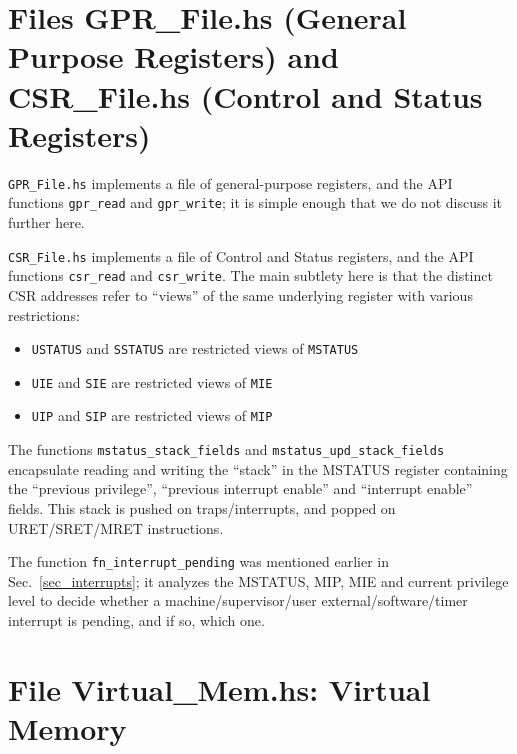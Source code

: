 \documentclass[11pt]{article}
\begin{document}

\section{Files GPR\_File.hs (General Purpose Registers) and CSR\_File.hs (Control and Status Registers)}

\label{sec_gprs_csrs}

\verb|GPR_File.hs| implements a file of general-purpose registers, and
the API functions \verb|gpr_read| and \verb|gpr_write|; it is simple
enough that we do not discuss it further here.

\verb|CSR_File.hs| implements a file of Control and Status registers,
and the API functions \verb|csr_read| and \verb|csr_write|.  The main
subtlety here is that the distinct CSR addresses refer to ``views'' of
the same underlying register with various restrictions:

\begin{itemize}
\item
\verb|USTATUS| and \verb|SSTATUS| are restricted views of \verb|MSTATUS|

\item
\verb|UIE| and \verb|SIE| are restricted views of \verb|MIE|

\item
\verb|UIP| and \verb|SIP| are restricted views of \verb|MIP|
\end{itemize}


The functions \verb|mstatus_stack_fields| and
\verb|mstatus_upd_stack_fields| encapsulate reading and writing the
``stack'' in the MSTATUS register containing the ``previous
privilege'', ``previous interrupt enable'' and ``interrupt enable''
fields.  This stack is pushed on traps/interrupts, and popped on
URET/SRET/MRET instructions.

The function \verb|fn_interrupt_pending| was mentioned earlier in
Sec.~\ref{sec_interrupts}; it analyzes the MSTATUS, MIP, MIE and
current privilege level to decide whether a machine/supervisor/user
external/software/timer interrupt is pending, and if so, which one.


\section{File Virtual\_Mem.hs: Virtual Memory}
\end{document}
